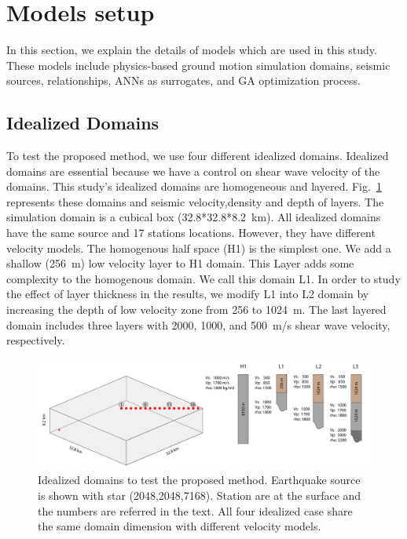 \section{ Models setup}

In this section, we explain the details of models which are used in this study.  These models include physics-based ground motion simulation domains, seismic sources, \qsvs{} relationships, ANNs as surrogates, and GA optimization process.  

\subsection{Idealized Domains}

To test the proposed method, we use four different idealized domains. Idealized domains are essential because we have a control on shear wave velocity of the domains. This study's idealized domains are homogeneous and layered. Fig.~\ref{fig:3d_domain_scenarios} represents these domains and seismic velocity,density and depth of layers.  The simulation domain is a cubical box (32.8*32.8*8.2~km). All idealized domains have the same source and 17 stations locations. However, they have different velocity models. The homogenous half space (H1) is the simplest one. We add a shallow (256~m) low velocity layer to H1 domain. This Layer adds some complexity to the homogenous domain. We call this domain L1. In order to study the effect of layer thickness in the results, we modify L1 into L2 domain by increasing the depth of low velocity zone from 256 to 1024~m. The last layered domain includes three layers with 2000, 1000, and 500~m/s shear wave velocity, respectively.  

 \begin{figure}[ht]
    \centering
    \includegraphics[width=\textwidth]{figures/pdf/Figure_05.pdf}
    \caption{Idealized domains to test the proposed method. Earthquake source is shown with star (2048,2048,7168). Station are at the surface and the numbers are referred in the text. All four idealized case share the same domain dimension with different velocity models.}
    \label{fig:3d_domain_scenarios}
\end{figure}

